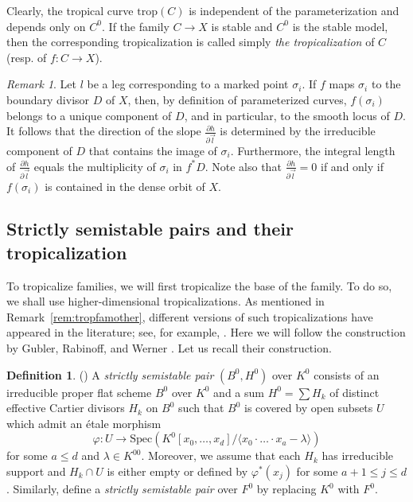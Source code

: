 \documentclass[11pt,reqno]{amsart}
\numberwithin{equation}{section}
\theoremstyle{definition}
\newtheorem{defn}[thm]{Definition}
\newcommand{\trop}{\mathrm{trop}}
\def\:{\colon}
\theoremstyle{remark}
\newtheorem{rem}[thm]{Remark}
\begin{document}
Clearly, the tropical curve $\trop(C)$ is independent of the parameterization and depends only on $C^0$. If the family $C\to X$ is stable and $C^0$ is the stable model, then the corresponding tropicalization is called simply {\em the tropicalization} of $C$ (resp. of $f\: C\to X$).

\begin{rem}\label{rem:slopesoflegs}
Let $l$ be a leg corresponding to a marked point $\sigma_i$. If $f$ maps $\sigma_i$ to the boundary divisor $D$ of $X$, then, by definition of parameterized curves, $f(\sigma_i)$ belongs to a unique component of $D$, and in particular, to the smooth locus of $D$. It follows that the direction of the slope $\frac{\partial h}{\partial \vec l}$ is determined by the irreducible component of $D$ that contains the image of $\sigma_i$. Furthermore, the integral length of $\frac{\partial h}{\partial \vec l}$ equals the multiplicity of $\sigma_i$ in $f^*D$.
Note also that $\frac{\partial h}{\partial \vec l} = 0$ if and only if $f(\sigma_i)$ is contained in the dense orbit of $X$.
\end{rem}

\subsection{Strictly semistable pairs and their tropicalization}
To tropicalize families, we will first tropicalize the base of the family. To do so, we shall use higher-dimensional tropicalizations. As mentioned in Remark~\ref{rem:tropfamother}, different versions of such tropicalizations have appeared in the literature; see, for example, \cite{MN15, ACGS, CCUW, Ran22, CGM}. Here we will follow the construction by Gubler, Rabinoff, and Werner \cite{GRW16}. Let us recall their construction.
\begin{defn}\label{defn:strictly semistable pairs}(\cite[Definition 3.1]{GRW16})
A \textit{strictly semistable pair} $(B^0,H^0)$ over $K^0$ consists of an irreducible proper flat scheme $B^0$ over $K^0$ and a sum $H^0=\sum H_k$ of distinct effective Cartier divisors $H_k$ on $B^0$ such that $B^0$ is covered by open subsets $U$ which admit an \'etale morphism 
\begin{equation}\label{eq:ssp}
\varphi\colon U\rightarrow \mathrm{Spec}(K^0[x_0,\dotsc,x_d]/\langle x_0\cdot\ldots\cdot x_a-\lambda\rangle)
\end{equation}
for some $a\leq d$ and $\lambda\in K^{00}$. Moreover, we assume that each $H_k$ has irreducible support and $H_k\cap U$ is either empty or defined by $\varphi^*(x_j)$ for some $a+1\leq j\leq d$. 
Similarly, define a \textit{strictly semistable pair} over $F^0$ by replacing $K^0$ with $F^0$. %
\end{defn}
\end{document}
